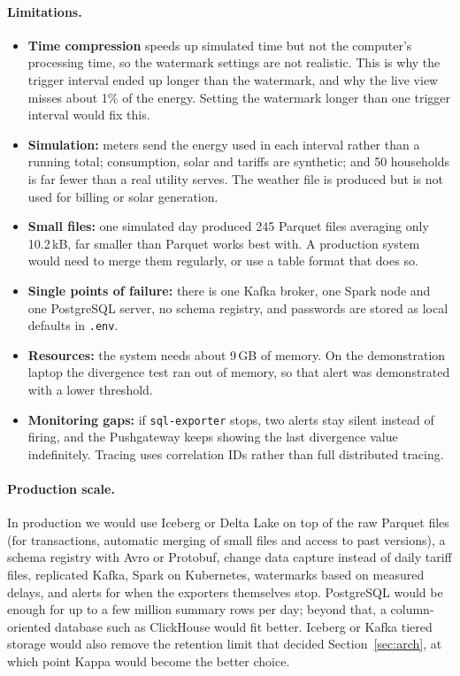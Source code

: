 \documentclass[11pt,a4paper]{article}
\begin{document}
\paragraph{Limitations.}
\begin{itemize}
  \item \textbf{Time compression} speeds up simulated time but not the computer's processing
        time, so the watermark settings are not realistic. This is why the trigger interval
        ended up longer than the watermark, and why the live view misses about 1\% of the
        energy. Setting the watermark longer than one trigger interval would fix this.
  \item \textbf{Simulation:} meters send the energy used in each interval rather than a
        running total; consumption, solar and tariffs are synthetic; and 50 households is far
        fewer than a real utility serves. The weather file is produced but is not used for
        billing or solar generation.
  \item \textbf{Small files:} one simulated day produced 245 Parquet files averaging only
        10.2\,kB, far smaller than Parquet works best with. A production system would need to
        merge them regularly, or use a table format that does so.
  \item \textbf{Single points of failure:} there is one Kafka broker, one Spark node and one
        PostgreSQL server, no schema registry, and passwords are stored as local defaults in
        \texttt{.env}.
  \item \textbf{Resources:} the system needs about 9\,GB of memory. On the demonstration
        laptop the divergence test ran out of memory, so that alert was demonstrated with a
        lower threshold.
  \item \textbf{Monitoring gaps:} if \texttt{sql-exporter} stops, two alerts stay silent
        instead of firing, and the Pushgateway keeps showing the last divergence value
        indefinitely. Tracing uses correlation IDs rather than full distributed tracing.
\end{itemize}

\paragraph{Production scale.} In production we would use Iceberg or Delta Lake on top of the
raw Parquet files (for transactions, automatic merging of small files and access to past
versions), a schema registry with Avro or Protobuf, change data capture instead of daily
tariff files, replicated Kafka, Spark on Kubernetes, watermarks based on measured delays, and
alerts for when the exporters themselves stop. PostgreSQL would be enough for up to a few
million summary rows per day; beyond that, a column-oriented database such as ClickHouse
would fit better. Iceberg or Kafka tiered storage would also remove the retention limit that
decided Section~\ref{sec:arch}, at which point Kappa would become the better choice.
\end{document}

